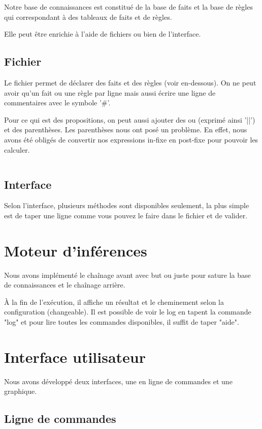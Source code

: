 \documentclass[a4paper, 11pt]{article}
\begin{document}
Notre base de connaissances est constitué de la base de faits et la base de règles qui correspondant à des tableaux de faits et de règles.

Elle peut être enrichie à l'aide de fichiers ou bien de l'interface.

\subsection{Fichier}

Le fichier permet de déclarer des faits et des règles (voir en-dessous).
On ne peut avoir qu'un fait ou une règle par ligne mais aussi écrire une ligne de commentaires avec le symbole '\#'.

Pour ce qui est des propositions, on peut aussi ajouter des ou (exprimé ainsi '||') et des parenthèses. Les parenthèses nous ont posé un problème. En effet, nous avons été obligés de convertir nos expressions in-fixe en post-fixe pour pouvoir les calculer.  

\inputminted{sql}{../maladies.txt}

\subsection{Interface}

Selon l'interface, plusieurs méthodes sont disponibles seulement, la plus simple est de taper une ligne comme vous pouvez le faire dans le fichier et de valider.

\section{Moteur d'inférences}

Nous avons implémenté le chaînage avant avec but ou juste pour sature la base de connaissances et le chaînage arrière.

À la fin de l'exécution, il affiche un résultat et le cheminement selon la configuration (changeable). Il est possible de voir le log en tapent la commande "log" et pour lire toutes les commandes disponibles, il suffit de taper "aide".

\section{Interface utilisateur}

Nous avons développé deux interfaces, une en ligne de commandes et une graphique. 

\subsection{Ligne de commandes}
\end{document}
